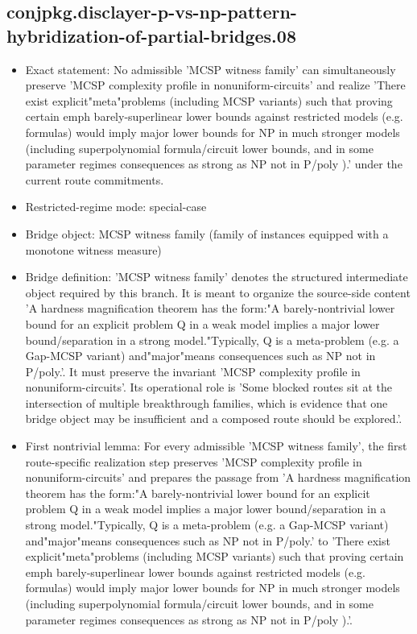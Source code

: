 \documentclass[11pt]{article}
\begin{document}
\subsection*{conjpkg.disclayer-p-vs-np-pattern-hybridization-of-partial-bridges.08}
\begin{itemize}
\item Exact statement: No admissible 'MCSP witness family' can simultaneously preserve 'MCSP complexity profile in nonuniform-circuits' and realize 'There exist explicit"meta"problems (including MCSP variants) such that proving certain emph barely-superlinear lower bounds against restricted models (e.g. formulas) would imply major lower bounds for NP in much stronger models (including superpolynomial formula/circuit lower bounds, and in some parameter regimes consequences as strong as NP not in P/poly ).' under the current route commitments.
\item Restricted-regime mode: special-case
\item Bridge object: MCSP witness family (family of instances equipped with a monotone witness measure)
\item Bridge definition: 'MCSP witness family' denotes the structured intermediate object required by this branch. It is meant to organize the source-side content 'A hardness magnification theorem has the form:"A barely-nontrivial lower bound for an explicit problem Q in a weak model implies a major lower bound/separation in a strong model."Typically, Q is a meta-problem (e.g. a Gap-MCSP variant) and"major"means consequences such as NP not in P/poly.'. It must preserve the invariant 'MCSP complexity profile in nonuniform-circuits'. Its operational role is 'Some blocked routes sit at the intersection of multiple breakthrough families, which is evidence that one bridge object may be insufficient and a composed route should be explored.'.
\item First nontrivial lemma: For every admissible 'MCSP witness family', the first route-specific realization step preserves 'MCSP complexity profile in nonuniform-circuits' and prepares the passage from 'A hardness magnification theorem has the form:"A barely-nontrivial lower bound for an explicit problem Q in a weak model implies a major lower bound/separation in a strong model."Typically, Q is a meta-problem (e.g. a Gap-MCSP variant) and"major"means consequences such as NP not in P/poly.' to 'There exist explicit"meta"problems (including MCSP variants) such that proving certain emph barely-superlinear lower bounds against restricted models (e.g. formulas) would imply major lower bounds for NP in much stronger models (including superpolynomial formula/circuit lower bounds, and in some parameter regimes consequences as strong as NP not in P/poly ).'.

\end{itemize}
\end{document}

